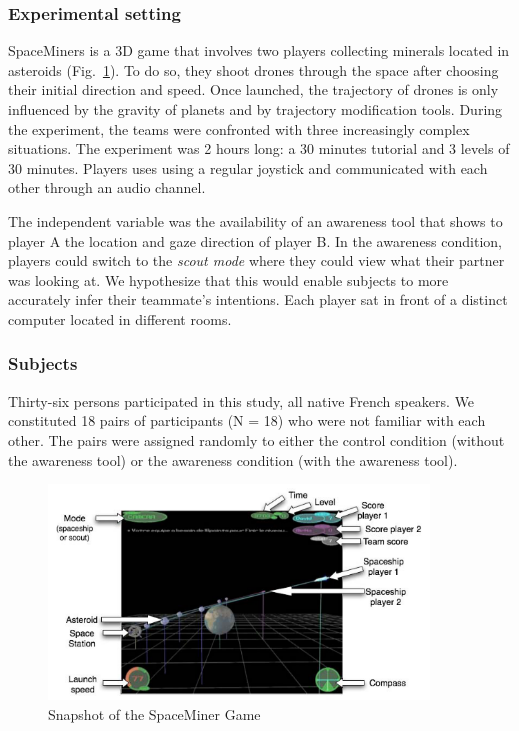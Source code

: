 \documentclass[twocolumn]{article}
\begin{document}
\subsubsection*{Experimental setting}

SpaceMiners is a 3D game that involves two players collecting minerals located
in asteroids (Fig.~\ref{study1:spaceminer}). To do so, they shoot drones through the space after choosing their
initial direction and speed. Once launched, the trajectory of drones is only
influenced by the gravity of planets and by trajectory modification tools.
During the experiment, the teams were confronted with three increasingly complex
situations. The experiment was 2 hours long: a 30 minutes tutorial and 3 levels
of 30 minutes. Players uses using a regular joystick and communicated with each
other through an audio channel.

The independent variable was the availability of an awareness tool that shows to
player A  the location and gaze direction of player B. In the awareness
condition, players could switch to the \emph{scout mode} where they could view what
their partner was looking at. We hypothesize that this would enable subjects to
more accurately infer their teammate's intentions. Each player sat in front of a
distinct computer located in different rooms. 

\subsubsection*{Subjects}

Thirty-six persons participated in this study, all native French speakers. We
constituted 18 pairs of participants (N = 18) who were not familiar with each
other. The pairs were assigned randomly to either the control condition (without
the awareness tool) or the awareness condition (with the awareness tool).

\begin{figure}
        \centering
        \includegraphics[width=0.9\textwidth]{image4.png}
        \caption{Snapshot of the SpaceMiner Game}
        \label{study1:spaceminer}
\end{figure}
\end{document}
